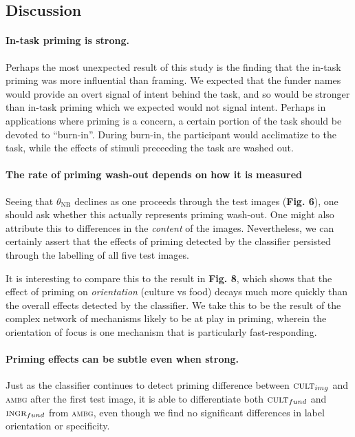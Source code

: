 \documentclass[a4paper]{report}
\begin{document}
\subsection*{Discussion}

\paragraph{In-task priming is strong.}  Perhaps the most unexpected result of 
this study is the finding that the in-task priming was more influential than
framing.  We expected that the funder names would provide an overt signal of 
intent behind the task, and so would be stronger than in-task priming which 
we expected would not signal intent.  Perhaps in applications where priming 
is a concern, a certain portion of the task should be devoted to  
``burn-in''.  During burn-in, the participant would acclimatize to the task, 
while the effects of stimuli preceeding the task are washed out.

\paragraph{The rate of priming wash-out depends on how it is measured}
Seeing that $\theta_\text{NB}$ declines as one proceeds through the test 
images (\textbf{Fig. 6}), one should ask whether this actually represents 
priming wash-out.  One might also attribute this to 
differences in the \textit{content} of the images.  Nevertheless, we can
certainly assert that the effects of priming detected by the classifier 
persisted through the labelling of all five test images.  

It is interesting to compare this to the result in \textbf{Fig. 8}, which
shows that the effect of priming on \textit{orientation} (culture vs food) 
decays much more quickly than the overall effects detected by
the classifier.  We take this to be the result of the complex network of 
mechanisms likely to be at play in priming, wherein the orientation of focus
is one mechanism that is particularly fast-responding.


\paragraph{Priming effects can be subtle even when strong.}
Just as the classifier continues to detect priming difference between 
$\textsc{cult}_{img}$ and \textsc{ambg} after the first test image,
it is able to differentiate both $\textsc{cult}_{fund}$ and 
$\textsc{ingr}_{fund}$ from \textsc{ambg}, even though we find no significant
differences in label orientation or specificity.  
\end{document}
